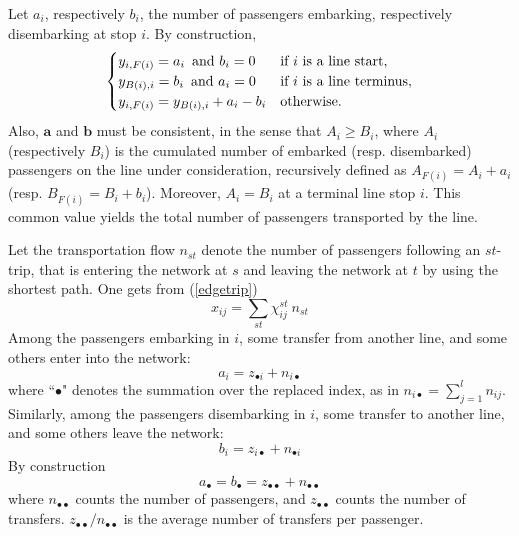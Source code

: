 \documentclass{bmcart}
\begin{document}
\vspace*{0.1cm}


Let $a_i$, respectively $b_i$, the number of passengers embarking, respectively disembarking at stop $i$. By construction, 
\begin{equation}
\label{bilan1ligne}
\begin{cases}
 y_{i,F(i)}=a_i \text{\,  and } b_i=0   & \text{if $i$ is a line start}, \\
y_{B(i),i}=b_i \text{\,  and } a_i=0   & \text{if $i$ is a line terminus}, \\
 y_{i,F(i)}=y_{B(i),i}+a_i-b_i     & \text{otherwise}.
\end{cases}
\end{equation}
Also, $\mathbf{a}$ and $\mathbf{b}$ must be consistent, in the sense that $A_i\ge B_i$, where $A_i$ (respectively $B_i$) is the cumulated number of embarked 
(resp. disembarked) passengers on the line under consideration, recursively defined as $A_{F(i)}=A_i+a_i$ (resp. $B_{F(i)}=B_i+b_i$). Moreover,  $A_i=B_i$ at a terminal line stop $i$. This common value yields  the total number of passengers transported by the line. 



\vspace*{0.1cm}

Let the transportation flow $n_{st}$ denote the number of passengers following an $st$-trip, that is entering the network at $s$ and leaving the network at $t$ by using the shortest path. One gets from (\ref{edgetrip}) 
\begin{equation}
\label{equationGG}
x_{ij}=\sum_{st}\chi_{ij}^{st}\:  n_{st}
\end{equation}
Among the passengers embarking in $i$, some transfer from another line, and some others enter into the network: 
\begin{equation}
\label{entrer}
a_i=z_{\bullet i}+n_{i\bullet}
\end{equation}
where  ``$\bullet$" denotes the summation over the replaced index, as in $n_{i\bullet}=\sum_{j=1}^l n_{ij}$. Similarly, among the passengers disembarking in $i$, some transfer to another line, and some others leave the network: 
\begin{equation}
\label{sortir}
b_i=z_{i\bullet}+n_{\bullet i}
\end{equation}
By construction
\begin{displaymath}
a_{\bullet}=b_{\bullet}=z_{\bullet\bullet}+n_{\bullet\bullet}
\end{displaymath}
where $n_{\bullet\bullet}$ counts the number of passengers, and $z_{\bullet\bullet}$ counts the number of transfers. $z_{\bullet\bullet}/n_{\bullet\bullet}$  is the average number of transfers per passenger. 
\end{document}
